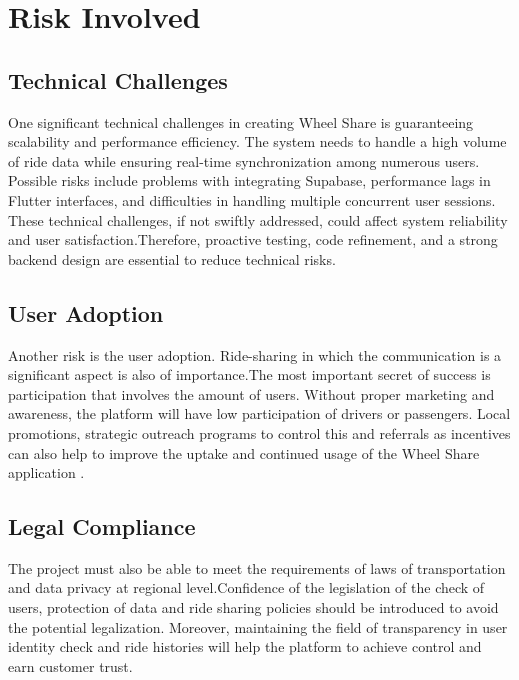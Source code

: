 \section{Risk Involved}

\subsection{Technical Challenges}
One significant technical challenges in creating Wheel Share is guaranteeing scalability and performance efficiency. The system needs to handle a high volume of ride data while ensuring real-time synchronization among numerous users. Possible risks include problems with integrating Supabase, performance lags in Flutter interfaces, and difficulties in handling multiple concurrent user sessions. These technical challenges, if not swiftly addressed, could affect system reliability and user satisfaction.Therefore, proactive testing, code refinement, and a strong backend design are essential to reduce technical risks.

\subsection{User Adoption}
Another risk is the user adoption. Ride-sharing in which the communication is a significant aspect is also of importance.The most important secret of success is participation that involves the amount of users. Without proper marketing and awareness, the platform will have low participation of drivers or passengers. Local promotions, strategic outreach programs to control this and referrals as incentives can also help to improve the uptake and continued usage of the Wheel Share application
\cite{compostella2025}.

\subsection{Legal Compliance}
The project must also be able to meet the requirements of laws of transportation and data privacy at regional level.Confidence of the legislation of the check of users, protection of data and ride sharing policies should be introduced to avoid the potential legalization. Moreover, maintaining the field of transparency in user identity check and ride histories will help the platform to achieve control and earn customer trust.

 
\clearpage



